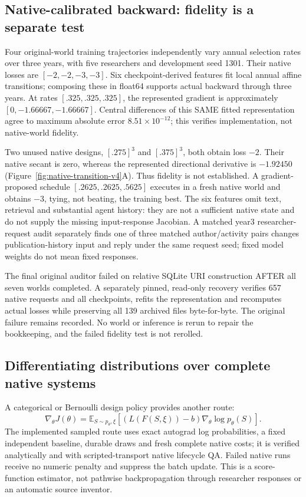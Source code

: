 \subsection{Native-calibrated backward: fidelity is a separate test}

Four original-world training trajectories independently vary annual selection
rates over three years, with five researchers and development seed 1301.
Their native losses are $[-2,-2,-3,-3]$. Six checkpoint-derived features fit
local annual affine transitions; composing these in float64 supports actual
backward through three years. At rates $[.325,.325,.325]$, the represented
gradient is approximately $[0,-1.66667,-1.66667]$. Central differences of this
SAME fitted representation agree to maximum absolute error
$8.51\times10^{-12}$; this verifies implementation, not native-world fidelity.

Two unused native designs, $[.275]^3$ and $[.375]^3$, both obtain loss $-2$.
Their native secant is zero, whereas the represented directional derivative
is $-1.92450$ (Figure~\ref{fig:native-transition-v4}A). Thus fidelity is not
established. A gradient-proposed schedule $[.2625,.2625,.5625]$ executes in a
fresh native world and obtains $-3$, tying, not beating, the training best.
The six features omit text, retrieval and substantial agent history: they are
not a sufficient native state and do not supply the missing input-response
Jacobian. A matched year3 researcher-request audit separately finds one of
three matched author/activity pairs changes publication-history input and reply
under the same request seed; fixed model weights do not mean fixed responses.

The final original auditor failed on relative SQLite URI construction AFTER
all seven worlds completed. A separately pinned, read-only recovery verifies
657 native requests and all checkpoints, refits the representation and
recomputes actual losses while preserving all 139 archived files byte-for-byte.
The original failure remains recorded. No world or inference is rerun to
repair the bookkeeping, and the failed fidelity test is not rerolled.

\subsection{Differentiating distributions over complete native systems}

A categorical or Bernoulli design policy provides another route:
\begin{equation}
 \nabla_\theta J(\theta)
 =\mathbb{E}_{S\sim p_\theta,\xi}
 \left[(L(F(S,\xi))-b)\nabla_\theta\log p_\theta(S)\right].
\end{equation}
The implemented sampled route uses exact autograd log probabilities, a fixed
independent baseline, durable draws and fresh complete native costs; it is
verified analytically and with scripted-transport native lifecycle QA. Failed native runs receive no numeric penalty and
suppress the batch update. This is a score-function estimator, not pathwise
backpropagation through researcher responses or an automatic source inventor.

